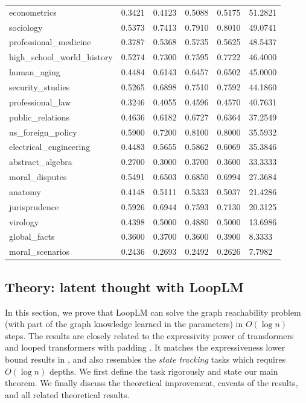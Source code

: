 \documentclass[]{bytedance_seed}
\newcommand{\1}{\mathbf{1}}
\newcommand{\ut}{LoopLM}
\begin{document}
{\begin{table}[htbp]
\begin{tabular}{lrrrrl}
econometrics & 0.3421 & 0.4123 & 0.5088 & 0.5175 & 51.2821 \\
sociology & 0.5373 & 0.7413 & 0.7910 & 0.8010 & 49.0741 \\
professional\_medicine & 0.3787 & 0.5368 & 0.5735 & 0.5625 & 48.5437 \\
high\_school\_world\_history & 0.5274 & 0.7300 & 0.7595 & 0.7722 & 46.4000 \\
human\_aging & 0.4484 & 0.6143 & 0.6457 & 0.6502 & 45.0000 \\
security\_studies & 0.5265 & 0.6898 & 0.7510 & 0.7592 & 44.1860 \\
professional\_law & 0.3246 & 0.4055 & 0.4596 & 0.4570 & 40.7631 \\
public\_relations & 0.4636 & 0.6182 & 0.6727 & 0.6364 & 37.2549 \\
us\_foreign\_policy & 0.5900 & 0.7200 & 0.8100 & 0.8000 & 35.5932 \\
electrical\_engineering & 0.4483 & 0.5655 & 0.5862 & 0.6069 & 35.3846 \\
abstract\_algebra & 0.2700 & 0.3000 & 0.3700 & 0.3600 & 33.3333 \\
moral\_disputes & 0.5491 & 0.6503 & 0.6850 & 0.6994 & 27.3684 \\
anatomy & 0.4148 & 0.5111 & 0.5333 & 0.5037 & 21.4286 \\
jurisprudence & 0.5926 & 0.6944 & 0.7593 & 0.7130 & 20.3125 \\
virology & 0.4398 & 0.5000 & 0.4880 & 0.5000 & 13.6986 \\
global\_facts & 0.3600 & 0.3700 & 0.3600 & 0.3900 & 8.3333 \\
moral\_scenarios & 0.2436 & 0.2693 & 0.2492 & 0.2626 & 7.7982 \\
\hline
\end{tabular}
\end{table}
\subsection{Theory: latent thought with \ut{}}
\label{appendix:theory}
In this section, we prove that \ut{} can solve the graph reachability problem (with part of the graph knowledge learned in the parameters) in $O(\log n)$ steps. The results are closely related to the expressivity power of transformers and looped transformers with padding \cite{merrill2025exact, merrill2025little, NEURIPS2024_8f395480, sanford2024transformers}. It matches the expressiveness lower bound results in \cite{NEURIPS2024_8f395480, sanford2024transformers}, and also resembles the \textit{state tracking} tasks \cite{liu2022transformers, wang2025learning} which requires $O(\log n)$ depths. We first define the task rigorously and state our main theorem. We finally discuss the theoretical improvement, caveats of the results, and all related theoretical results.

}
\end{document}
